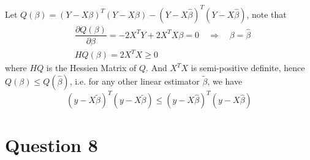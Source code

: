 \documentclass[12pt]{article}
\begin{document}
Let $Q(\beta)=(Y-X\beta)^T(Y-X\beta)-(Y-X\hat{\beta})^T(Y-X\hat{\beta})$, note that
\begin{align*}
    &\dfrac{\partial Q(\beta)}{\partial\beta}=-2X^TY+2X^TX\beta=0\quad \Rightarrow\quad \beta=\hat\beta\\
    &HQ(\beta)=2X^T X \geqslant 0
\end{align*}
where $HQ$ is the Hessien Matrix of $Q$. And $X^TX$ is semi-positive definite, hence $Q(\beta)\leqslant Q(\hat\beta)$, i.e. for any other linear estimator $\tilde \beta$, we have
\begin{equation}
    (y-X\tilde\beta)^T(y-X\tilde\beta)\leqslant (y-X\hat\beta)^T(y-X\hat\beta)
\end{equation}

\section{Question 8}
\end{document}
